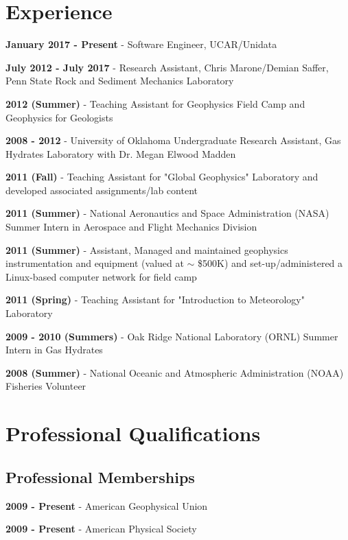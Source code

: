 \documentclass[letterpaper]{article}
\renewenvironment{itemize}{
  \begin{list}{}{
    \setlength{\leftmargin}{1.5em}
  }
}{
  \end{list}
}
\begin{document}
\section*{Experience}

\begin{itemize}
\item \textbf{January 2017 - Present} - Software Engineer, UCAR/Unidata
\item \textbf{July 2012 - July 2017} - Research Assistant, Chris Marone/Demian Saffer, Penn State Rock and Sediment Mechanics Laboratory
\item \textbf{2012 (Summer)} - Teaching Assistant for Geophysics Field Camp and Geophysics for Geologists
\item \textbf{2008 - 2012} - University of Oklahoma Undergraduate Research Assistant, Gas Hydrates Laboratory with Dr. Megan Elwood Madden
\item \textbf{2011 (Fall)} - Teaching Assistant for "Global Geophysics" Laboratory and developed associated assignments/lab content
\item \textbf{2011 (Summer)} - National Aeronautics and Space Administration (NASA) Summer Intern in Aerospace and Flight Mechanics Division
\item \textbf{2011 (Summer)} - Assistant, Managed and maintained geophysics instrumentation and equipment (valued at $\sim$ \$500K) and set-up/administered a Linux-based computer network for field camp
\item \textbf{2011 (Spring)} - Teaching Assistant for "Introduction to Meteorology" Laboratory
\item \textbf{2009 - 2010 (Summers)} - Oak Ridge National Laboratory (ORNL) Summer Intern in Gas Hydrates
\item \textbf{2008 (Summer)} - National Oceanic and Atmospheric Administration (NOAA) Fisheries Volunteer
\end{itemize}

\section*{Professional Qualifications}

\subsection*{Professional Memberships}
\begin{itemize}
\item \textbf{2009 - Present} - American Geophysical Union
\item \textbf{2009 - Present} - American Physical Society
\end{itemize}
\end{document}
